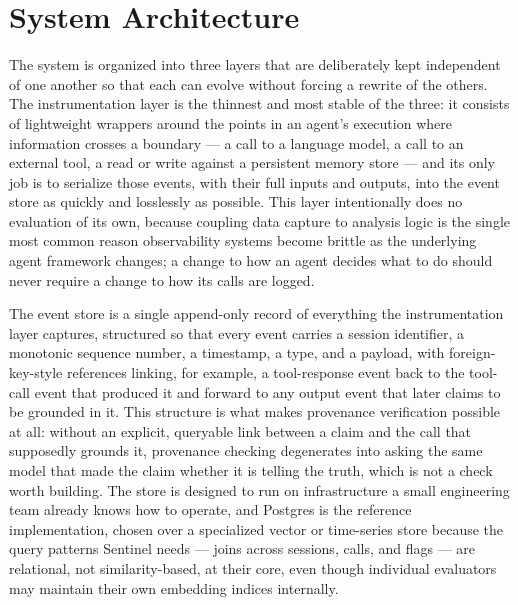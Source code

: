 \documentclass[11pt,a4paper]{article}
\begin{document}
\section{System Architecture}

The system is organized into three layers that are deliberately kept independent of one another so that each can evolve without forcing a rewrite of the others. The instrumentation layer is the thinnest and most stable of the three: it consists of lightweight wrappers around the points in an agent's execution where information crosses a boundary --- a call to a language model, a call to an external tool, a read or write against a persistent memory store --- and its only job is to serialize those events, with their full inputs and outputs, into the event store as quickly and losslessly as possible. This layer intentionally does no evaluation of its own, because coupling data capture to analysis logic is the single most common reason observability systems become brittle as the underlying agent framework changes; a change to how an agent decides what to do should never require a change to how its calls are logged.

The event store is a single append-only record of everything the instrumentation layer captures, structured so that every event carries a session identifier, a monotonic sequence number, a timestamp, a type, and a payload, with foreign-key-style references linking, for example, a tool-response event back to the tool-call event that produced it and forward to any output event that later claims to be grounded in it. This structure is what makes provenance verification possible at all: without an explicit, queryable link between a claim and the call that supposedly grounds it, provenance checking degenerates into asking the same model that made the claim whether it is telling the truth, which is not a check worth building. The store is designed to run on infrastructure a small engineering team already knows how to operate, and Postgres is the reference implementation, chosen over a specialized vector or time-series store because the query patterns Sentinel needs --- joins across sessions, calls, and flags --- are relational, not similarity-based, at their core, even though individual evaluators may maintain their own embedding indices internally.
\end{document}
